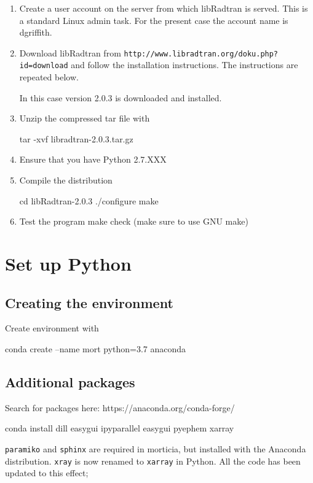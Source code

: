 \begin{enumerate}
\item Create a user account on the server from which libRadtran is served. This is a standard Linux admin task.  For the present case the account name is dgriffith.

\item Download libRadtran from \lstinline{http://www.libradtran.org/doku.php?id=download} and follow the installation instructions. The instructions are repeated below.

    In this case version 2.0.3 is downloaded and installed.

\item Unzip the compressed tar file with 

    tar -xvf  libradtran-2.0.3.tar.gz

\item Ensure that you have Python 2.7.XXX

\item Compile the distribution

        cd libRadtran-2.0.3
        ./configure
        make

\item Test the program
    make check (make sure to use GNU make)

\end{enumerate}


\section{Set up Python}



\subsection{Creating the environment}

Create environment with 

    conda create --name mort python=3.7 anaconda

\subsection{Additional packages}

Search for packages here: https://anaconda.org/conda-forge/

conda install  dill easygui ipyparallel easygui pyephem xarray

\lstinline{paramiko} and \lstinline{sphinx} are required in morticia, but installed with the Anaconda distribution.  \lstinline{xray} is now renamed to \lstinline{xarray} in Python. All the code has been updated to this effect; 

